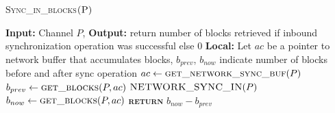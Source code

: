 \documentclass[10pt]{article}
\begin{document}

\begin{algorithm}{}
\footnotesize
\caption{\textsc{Sync\_in\_blocks}{$\textsc{(P})$}}
\label{alg:Sync_in_blocks} 
\begin{algorithmic}[1]

\STATE \textbf{Input:} Channel $P$,
\STATE \textbf{Output:} return number of blocks retrieved if inbound synchronization operation was successful else {$0$}
\STATE \textbf{Local:} Let $ac$ be a pointer to network buffer that accumulates blocks, $b_{prev}$, $b_{now}$ indicate number of blocks before and after sync operation
\STATE \quad $\textbf{$ac$} \leftarrow  \textsc{get\_network\_sync\_buf}(P)$ 
\STATE \quad $\textbf{$b_{prev}$} \leftarrow  \textsc{get\_blocks}(P, ac)$ 
\STATE \quad $\textsc{NETWORK\_SYNC\_IN}(P)$ 
\STATE \quad $\textbf{$b_{now}$} \leftarrow  \textsc{get\_blocks}(P, ac)$ 
\STATE \textsc{\textbf{return}} {$b_{now} - b_{prev}$}
\STATE


\end{algorithmic}
\end{algorithm}


\end{document}
